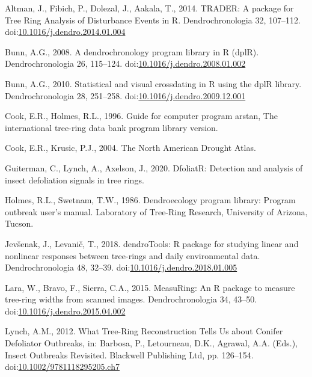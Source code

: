 \documentclass[review]{elsarticle} %
\begin{document}
\hypertarget{refs}{}
\leavevmode\hypertarget{ref-Altman2014}{}%
Altman, J., Fibich, P., Dolezal, J., Aakala, T., 2014. TRADER: A package for Tree Ring Analysis of Disturbance Events in R. Dendrochronologia 32, 107--112. doi:\href{https://doi.org/10.1016/j.dendro.2014.01.004}{10.1016/j.dendro.2014.01.004}

\leavevmode\hypertarget{ref-Bunn2008}{}%
Bunn, A.G., 2008. A dendrochronology program library in R (dplR). Dendrochronologia 26, 115--124. doi:\href{https://doi.org/10.1016/j.dendro.2008.01.002}{10.1016/j.dendro.2008.01.002}

\leavevmode\hypertarget{ref-Bunn2010}{}%
Bunn, A.G., 2010. Statistical and visual crossdating in R using the dplR library. Dendrochronologia 28, 251--258. doi:\href{https://doi.org/10.1016/j.dendro.2009.12.001}{10.1016/j.dendro.2009.12.001}

\leavevmode\hypertarget{ref-arstan}{}%
Cook, E.R., Holmes, R.L., 1996. Guide for computer program arstan, The international tree-ring data bank program library version.

\leavevmode\hypertarget{ref-Cook2004}{}%
Cook, E.R., Krusic, P.J., 2004. The North American Drought Atlas.

\leavevmode\hypertarget{ref-dfoliatR}{}%
Guiterman, C., Lynch, A., Axelson, J., 2020. DfoliatR: Detection and analysis of insect defoliation signals in tree rings.

\leavevmode\hypertarget{ref-outbreak}{}%
Holmes, R.L., Swetnam, T.W., 1986. Dendroecology program library: Program outbreak user's manual. Laboratory of Tree-Ring Research, University of Arizona, Tucson.

\leavevmode\hypertarget{ref-Jevsenak2018}{}%
Jevšenak, J., Levanič, T., 2018. dendroTools: R package for studying linear and nonlinear responses between tree-rings and daily environmental data. Dendrochronologia 48, 32--39. doi:\href{https://doi.org/10.1016/j.dendro.2018.01.005}{10.1016/j.dendro.2018.01.005}

\leavevmode\hypertarget{ref-Lara2015}{}%
Lara, W., Bravo, F., Sierra, C.A., 2015. MeasuRing: An R package to measure tree-ring widths from scanned images. Dendrochronologia 34, 43--50. doi:\href{https://doi.org/10.1016/j.dendro.2015.04.002}{10.1016/j.dendro.2015.04.002}

\leavevmode\hypertarget{ref-Lynch2012}{}%
Lynch, A.M., 2012. What Tree-Ring Reconstruction Tells Us about Conifer Defoliator Outbreaks, in: Barbosa, P., Letourneau, D.K., Agrawal, A.A. (Eds.), Insect Outbreaks Revisited. Blackwell Publishing Ltd, pp. 126--154. doi:\href{https://doi.org/10.1002/9781118295205.ch7}{10.1002/9781118295205.ch7}
\end{document}

